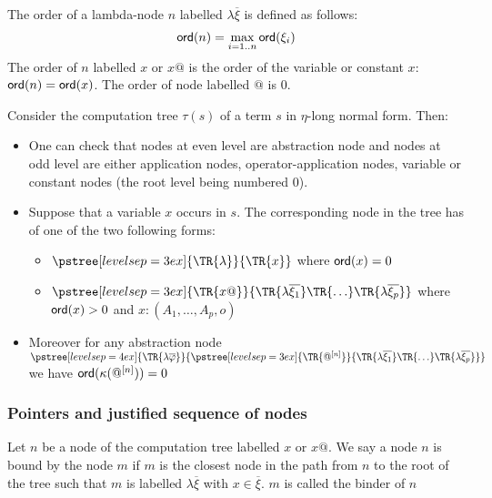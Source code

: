 \begin{dfn}
The order of a lambda-node $n$ labelled $\lambda \overline{\xi}$ is defined as follows:
$${\sf ord}(n) = \max_{i=1..n} {\sf ord}(\xi_i)$$
The order of $n$ labelled $x$ or $x@$ is the order of the variable or constant $x$:
${\sf ord}(n) = {\sf ord}(x)$.
The order of node labelled $@$ is $0$.
\end{dfn}


Consider the computation tree $\tau(s)$ of a term $s$ in $\eta$-long normal form. Then:
\begin{itemize}
\item One can check that nodes at even level are abstraction
node and nodes at odd level are either application nodes,
operator-application nodes, variable or constant nodes (the root level being numbered $0$).

\item Suppose that a variable $x$ occurs in $s$. The corresponding node in the tree has of one of the two following forms:
    \begin{itemize}
    \item $ \pstree[levelsep=3ex]
        { \TR{\lambda } }
        { \TR{x}
        }$ where ${\sf ord}(x) = 0$

    \item $ \pstree[levelsep=3ex]
                { \TR{x @} }
                { \TR{\lambda \overline{\xi_1}} \TR{\ldots} \TR{\lambda \overline{\xi_p}}}
        $ where ${\sf ord}(x) > 0$ and $x:(A_1,\ldots,A_p,o)$
    \end{itemize}

\item    Moreover for any abstraction node
        $ \pstree[levelsep=4ex]
            { \TR{\lambda \overline{\varphi}} }
            { \pstree[levelsep=3ex]
                {\TR{@^{[n]}}}
                {\TR{\lambda \overline{\xi_1}} \TR{\ldots} \TR{\lambda \overline{\xi_p}}}
            }
        $
    we have ${\sf ord}(\kappa(@^{[n]}))=0$

\end{itemize}



\subsubsection{Pointers and justified sequence of nodes}

\begin{dfn}[Binder]
Let $n$ be a node of the computation tree labelled $x$ or $x@$.
We say a node $n$ is bound by the node $m$ if $m$ is
the closest node in the path from $n$ to the root of the tree such that
$m$ is labelled $\lambda \overline{\xi}$ with $x\in \overline{\xi}$.
$m$ is called the binder of $n$
\end{dfn}

